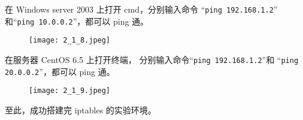 在 Windows server 2003 上打开 cmd，分别输入命令
``\texttt{ping 192.168.1.2}''
和``\texttt{ping 10.0.0.2}''，都可以 ping 通。
\begin{figure}[H]
  \begin{center}
    \texttt{[image: 2\_1\_8.jpeg]}
  \end{center}
\end{figure}

在服务器 CentOS 6.5 上打开终端，
分别输入命令``\texttt{ping 192.168.1.2}''和
``\texttt{ping 20.0.0.2}''，都可以 ping 通。
\begin{figure}[H]
  \begin{center}
    \texttt{[image: 2\_1\_9.jpeg]}
  \end{center}
\end{figure}

至此，成功搭建完 iptables 的实验环境。
%
